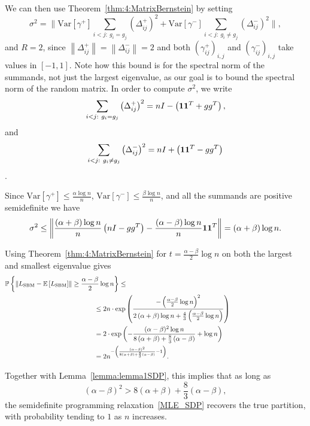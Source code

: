 We can then use Theorem~\ref{thm:4:MatrixBernstein} by setting
\begin{equation}\label{eq:matrix_inside_sigma2}
\sigma^2 = \Big\|  \mathrm{Var}\left[\gamma^+\right]\sum_{i<j:\ g_i=g_j}\left(\Delta^+_{ij}\right)^2+ \mathrm{Var}\left[\gamma^-\right]\sum_{i<j:\ g_i\neq g_j}\left(\Delta^-_{ij}\right)^2  \Big\|,
\end{equation}
and $R=2$, since $\left\|\Delta^+_{ij}\right\|=\left\|\Delta^-_{ij}\right\|=2$ and both $(\gamma_{ij}^+)_{i,j}$ and $(\gamma_{ij}^-)_{i,j}$ take values in $[-1,1]$. Note how this bound is for the spectral norm of the summands, not just the largest eigenvalue, as our goal is to bound the spectral norm of the random matrix.
In order to compute $\sigma^2$, we write
$$ \sum_{i<j:\ g_i=g_j}\left(\Delta^+_{ij}\right)^2 = nI - \left(\1\1^T + gg^T\right),$$
and
$$ \sum_{i<j:\ g_i\neq g_j}\left(\Delta^-_{ij}\right)^2 = nI + \left(\1\1^T - gg^T\right)$$.

Since $\mathrm{Var}\left[\gamma^+\right] \leq \frac{\alpha\log n}{n}$, $\mathrm{Var}\left[\gamma^-\right] \leq \frac{\beta\log n}{n}$, and all the summands are positive semidefinite we have
\[
\sigma^2 \leq \left\| \frac{(\alpha+\beta)\log n}{n}\left(nI-gg^T\right) - \frac{(\alpha-\beta)\log n}{n}\mathbf{1}\mathbf{1}^T \right\| = (\alpha+\beta)\log n.
\]

Using Theorem~\ref{thm:4:MatrixBernstein} for $t= \frac{\alpha-\beta}2\log n$ on both the largest and smallest eigenvalue gives
\begin{align*}
& \Prob\left\{ \left\|  L_\text{SBM}  - \EE\left[ L_\text{SBM} \right] \right\| \geq \frac{\alpha-\beta}2  \log n \right\}    \leq{}  \\
 &  \hspace*{47mm} \le    2n \cdot \exp\left(  \frac{-\left( \frac{\alpha-\beta}2 \log n \right)^2}{2\left(\alpha+\beta\right) \log n  + \frac43\left( \frac{\alpha-\beta}2 \log n \right)} \right) \hspace*{40mm} \\
 & \hspace*{47mm} =  2 \cdot \exp\left( -\frac{(\alpha-\beta)^2 \log n }{8\left(\alpha+\beta\right)  + \frac{8}3\left( \alpha-\beta  \right)} + \log n \right)\\
 & \hspace*{47mm} =  2 n^{-\left(\frac{(\alpha-\beta)^2 }{8\left(\alpha+\beta\right)  + \frac{8}3\left( \alpha-\beta  \right)} -1 \right)}.
\end{align*}

Together with Lemma~\ref{lemma:lemma1SDP}, this implies that as long as
\begin{equation}\label{SBM_exact_suboptimalcondition}
(\alpha-\beta)^2 > 8\left(\alpha+\beta\right) + \frac{8}3\left( \alpha-\beta  \right),
\end{equation}
the semidefinite programming relaxation~\eqref{MLE_SDP} recovers the true partition, with probability tending to $1$ as $n$ increases.






